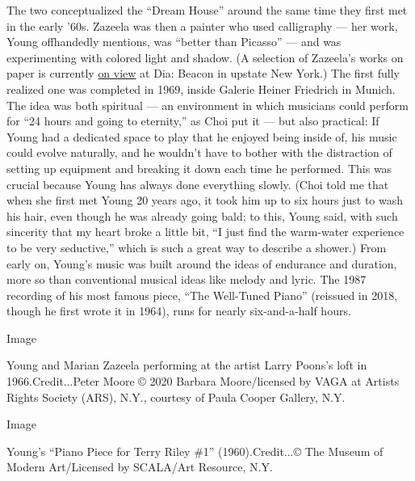 The two conceptualized the ``Dream House'' around the same time they
first met in the early '60s. Zazeela was then a painter who used
calligraphy --- her work, Young offhandedly mentions, was ``better than
Picasso'' --- and was experimenting with colored light and shadow. (A
selection of Zazeela's works on paper is currently
\href{https://www.diaart.org/exhibition/exhibitions-projects/marian-zazeela-exhibition}{on
view} at Dia: Beacon in upstate New York.) The first fully realized one
was completed in 1969, inside Galerie Heiner Friedrich in Munich. The
idea was both spiritual --- an environment in which musicians could
perform for ``24 hours and going to eternity,'' as Choi put it --- but
also practical: If Young had a dedicated space to play that he enjoyed
being inside of, his music could evolve naturally, and he wouldn't have
to bother with the distraction of setting up equipment and breaking it
down each time he performed. This was crucial because Young has always
done everything slowly. (Choi told me that when she first met Young 20
years ago, it took him up to six hours just to wash his hair, even
though he was already going bald; to this, Young said, with such
sincerity that my heart broke a little bit, ``I just find the warm-water
experience to be very seductive,'' which is such a great way to describe
a shower.) From early on, Young's music was built around the ideas of
endurance and duration, more so than conventional musical ideas like
melody and lyric. The 1987 recording of his most famous piece, ``The
Well-Tuned Piano'' (reissued in 2018, though he first wrote it in 1964),
runs for nearly six-and-a-half hours.

Image

Young and Marian Zazeela performing at the artist Larry Poons's loft in
1966.Credit...Peter Moore © 2020 Barbara Moore/licensed by VAGA at
Artists Rights Society (ARS), N.Y., courtesy of Paula Cooper Gallery,
N.Y.

Image

Young's ``Piano Piece for Terry Riley \#1'' (1960).Credit...© The Museum
of Modern Art/Licensed by SCALA/Art Resource, N.Y.


